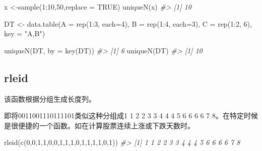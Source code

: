 \documentclass[
]{book}
\newenvironment{Shaded}{\begin{snugshade}}{\end{snugshade}}
\newcommand{\AttributeTok}[1]{\textcolor[rgb]{0.77,0.63,0.00}{#1}}
\newcommand{\CommentTok}[1]{\textcolor[rgb]{0.56,0.35,0.01}{\textit{#1}}}
\newcommand{\ConstantTok}[1]{\textcolor[rgb]{0.00,0.00,0.00}{#1}}
\newcommand{\DecValTok}[1]{\textcolor[rgb]{0.00,0.00,0.81}{#1}}
\newcommand{\FunctionTok}[1]{\textcolor[rgb]{0.00,0.00,0.00}{#1}}
\newcommand{\NormalTok}[1]{#1}
\newcommand{\OtherTok}[1]{\textcolor[rgb]{0.56,0.35,0.01}{#1}}
\newcommand{\SpecialCharTok}[1]{\textcolor[rgb]{0.00,0.00,0.00}{#1}}
\newcommand{\StringTok}[1]{\textcolor[rgb]{0.31,0.60,0.02}{#1}}
\begin{document}
\begin{Shaded}
\begin{Highlighting}[]
\NormalTok{x }\OtherTok{\textless{}{-}}\FunctionTok{sample}\NormalTok{(}\DecValTok{1}\SpecialCharTok{:}\DecValTok{10}\NormalTok{,}\DecValTok{50}\NormalTok{,}\AttributeTok{replace =} \ConstantTok{TRUE}\NormalTok{)}
\FunctionTok{uniqueN}\NormalTok{(x)}
\CommentTok{\#\textgreater{} [1] 10}

\NormalTok{DT }\OtherTok{\textless{}{-}} \FunctionTok{data.table}\NormalTok{(}\AttributeTok{A =} \FunctionTok{rep}\NormalTok{(}\DecValTok{1}\SpecialCharTok{:}\DecValTok{3}\NormalTok{, }\AttributeTok{each=}\DecValTok{4}\NormalTok{), }\AttributeTok{B =} \FunctionTok{rep}\NormalTok{(}\DecValTok{1}\SpecialCharTok{:}\DecValTok{4}\NormalTok{, }\AttributeTok{each=}\DecValTok{3}\NormalTok{),}
                 \AttributeTok{C =} \FunctionTok{rep}\NormalTok{(}\DecValTok{1}\SpecialCharTok{:}\DecValTok{2}\NormalTok{, }\DecValTok{6}\NormalTok{), }\AttributeTok{key =} \StringTok{"A,B"}\NormalTok{)}

\FunctionTok{uniqueN}\NormalTok{(DT, }\AttributeTok{by =} \FunctionTok{key}\NormalTok{(DT))}
\CommentTok{\#\textgreater{} [1] 6}
\FunctionTok{uniqueN}\NormalTok{(DT)}
\CommentTok{\#\textgreater{} [1] 10}
\end{Highlighting}
\end{Shaded}

\hypertarget{rleid}{%
\subsection{rleid}\label{rleid}}

该函数根据分组生成长度列。

即将0011001110111101类似这种分组成1 1 2 2 3 3 4 4 4 5 6 6 6 6 7 8。在特定时候是很便捷的一个函数。如在计算股票连续上涨或下跌天数时。

\begin{Shaded}
\begin{Highlighting}[]
\FunctionTok{rleid}\NormalTok{(}\FunctionTok{c}\NormalTok{(}\DecValTok{0}\NormalTok{,}\DecValTok{0}\NormalTok{,}\DecValTok{1}\NormalTok{,}\DecValTok{1}\NormalTok{,}\DecValTok{0}\NormalTok{,}\DecValTok{0}\NormalTok{,}\DecValTok{1}\NormalTok{,}\DecValTok{1}\NormalTok{,}\DecValTok{1}\NormalTok{,}\DecValTok{0}\NormalTok{,}\DecValTok{1}\NormalTok{,}\DecValTok{1}\NormalTok{,}\DecValTok{1}\NormalTok{,}\DecValTok{1}\NormalTok{,}\DecValTok{0}\NormalTok{,}\DecValTok{1}\NormalTok{))}
\CommentTok{\#\textgreater{}  [1] 1 1 2 2 3 3 4 4 4 5 6 6 6 6 7 8}
\end{Highlighting}
\end{Shaded}
\end{document}
